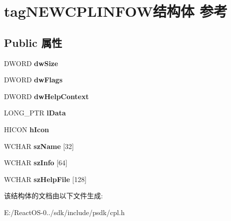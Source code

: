 \hypertarget{structtag_n_e_w_c_p_l_i_n_f_o_w}{}\section{tag\+N\+E\+W\+C\+P\+L\+I\+N\+F\+O\+W结构体 参考}
\label{structtag_n_e_w_c_p_l_i_n_f_o_w}
\subsection*{Public 属性}
\begin{DoxyCompactItemize}
\item 
\mbox{\label{structtag_n_e_w_c_p_l_i_n_f_o_w_aa3340862b3c6425fe7fa5782a6e9a1b7}} 
D\+W\+O\+RD {\bfseries dw\+Size}
\item 
\mbox{\label{structtag_n_e_w_c_p_l_i_n_f_o_w_af0f399070700bc17b7b555abad6db81e}} 
D\+W\+O\+RD {\bfseries dw\+Flags}
\item 
\mbox{\label{structtag_n_e_w_c_p_l_i_n_f_o_w_a4d3a1eedf6ceeadb71cc8a5c81035e3c}} 
D\+W\+O\+RD {\bfseries dw\+Help\+Context}
\item 
\mbox{\label{structtag_n_e_w_c_p_l_i_n_f_o_w_a4727146a332aab1ff1cdd151639bd3e5}} 
L\+O\+N\+G\+\_\+\+P\+TR {\bfseries l\+Data}
\item 
\mbox{\label{structtag_n_e_w_c_p_l_i_n_f_o_w_a7d52f0efc08c2234cddf94b92ee4176a}} 
H\+I\+C\+ON {\bfseries h\+Icon}
\item 
\mbox{\label{structtag_n_e_w_c_p_l_i_n_f_o_w_a7f9a7b4352f89ce0f525bc6e9609f72f}} 
W\+C\+H\+AR {\bfseries sz\+Name} \mbox{[}32\mbox{]}
\item 
\mbox{\label{structtag_n_e_w_c_p_l_i_n_f_o_w_a7fbdf9a7a39ab00cd53820f7bb6521e4}} 
W\+C\+H\+AR {\bfseries sz\+Info} \mbox{[}64\mbox{]}
\item 
\mbox{\label{structtag_n_e_w_c_p_l_i_n_f_o_w_af8f1efbbe5032ff521e55ccdb5169838}} 
W\+C\+H\+AR {\bfseries sz\+Help\+File} \mbox{[}128\mbox{]}
\end{DoxyCompactItemize}


该结构体的文档由以下文件生成\+:\begin{DoxyCompactItemize}
\item 
E\+:/\+React\+O\+S-\/0../sdk/include/psdk/cpl.\+h\end{DoxyCompactItemize}

